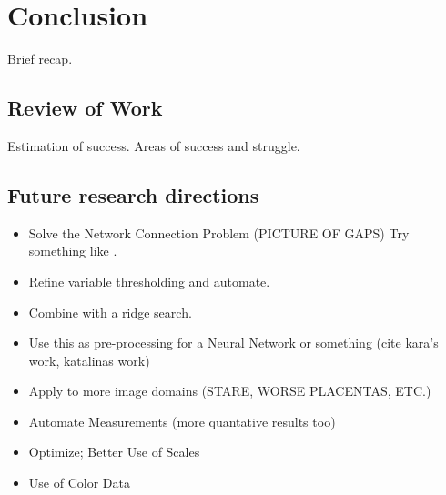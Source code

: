
\chapter{Conclusion}

Brief recap.

\section{Review of Work}

Estimation of success. Areas of success and struggle.

\section{Future research directions} \label{sec:future-research-directions}

\begin{itemize}
	\item Solve the Network Connection Problem (PICTURE OF GAPS)
	Try something like \cite{laptev2000automatic}.
	\item Refine variable thresholding and automate.
	\item Combine with a ridge search.
	\item Use this as pre-processing for a Neural Network or something
	(cite kara's work, katalinas work)
	\item Apply to more image domains (STARE, WORSE PLACENTAS, ETC.)
	\item Automate Measurements (more quantative results too)
	\item Optimize; Better Use of Scales
	\item Use of Color Data
\end{itemize}
